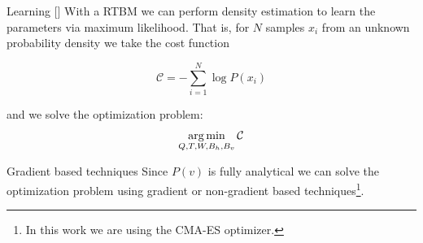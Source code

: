 \documentclass[10pt]{beamer}
\begin{document}
\begin{frame}{Learning \hfill \small [\cite{2020}]}
    With a RTBM we can perform density estimation to learn the parameters via
    maximum likelihood. That is, for $N$ samples $x_i$ from an unknown
    probability density we take the cost function
   
    \begin{equation*}
        \mathcal{C}  = - \sum_{i=1}^N \log  P(x_i)
        \end{equation*}

    and we solve the optimization problem:
    \begin{equation*}
            \operatorname*{arg\,min}_{Q,T,W,B_h,B_v} \mathcal{C}
        \end{equation*} 

        \begin{block}{Gradient based techniques}
        Since $P(v)$ is fully analytical we can solve the optimization 
        problem using gradient or non-gradient based techniques\footnote{In this work
        we are using the CMA-ES optimizer.}.
        \end{block}



\end{frame}
\end{document}
